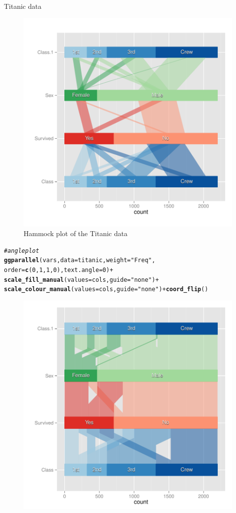 \documentclass[11pt]{book}\usepackage[]{graphicx}\usepackage[]{color}
\makeatletter
\newcommand{\hlnum}[1]{\textcolor[rgb]{0.686,0.059,0.569}{#1}}%
\newcommand{\hlstr}[1]{\textcolor[rgb]{0.192,0.494,0.8}{#1}}%
\newcommand{\hlcom}[1]{\textcolor[rgb]{0.678,0.584,0.686}{\textit{#1}}}%
\newcommand{\hlopt}[1]{\textcolor[rgb]{0,0,0}{#1}}%
\newcommand{\hlstd}[1]{\textcolor[rgb]{0.345,0.345,0.345}{#1}}%
\newcommand{\hlkwc}[1]{\textcolor[rgb]{0.333,0.667,0.333}{#1}}%
\newcommand{\hlkwd}[1]{\textcolor[rgb]{0.737,0.353,0.396}{\textbf{#1}}}%
\newenvironment{kframe}{%
 \def\at@end@of@kframe{}%
 \ifinner\ifhmode%
  \def\at@end@of@kframe{\end{minipage}}%
  \begin{minipage}{\columnwidth}%
 \fi\fi%
 \def\FrameCommand##1{\hskip\@totalleftmargin \hskip-\fboxsep
 \colorbox{shadecolor}{##1}\hskip-\fboxsep
     \hskip-\linewidth \hskip-\@totalleftmargin \hskip\columnwidth}%
 \MakeFramed {\advance\hsize-\width
   \@totalleftmargin\z@ \linewidth\hsize
   \@setminipage}}%
 {\par\unskip\endMakeFramed%
 \at@end@of@kframe}
\newenvironment{knitrout}{}{} %
\renewenvironment{knitrout}{\small\renewcommand{\baselinestretch}{.85}}{} %
\makeatother
\begin{document}
\begin{Example}{Titanic data}
\begin{knitrout}
\begin{figure}[htbp]
\centerline{\includegraphics[width=.6\textwidth]{ch05/fig/titanic-par2} }

\caption[Hammock plot of the Titanic data]{Hammock plot of the Titanic data\label{fig:titanic-par2}}
\end{figure}


\end{knitrout}


\begin{knitrout}
\color{fgcolor}\begin{kframe}
\begin{alltt}
\hlcom{# angle plot}
\hlkwd{ggparallel}\hlstd{(vars,} \hlkwc{data}\hlstd{=titanic,} \hlkwc{weight}\hlstd{=}\hlstr{"Freq"}\hlstd{,}
           \hlkwc{order}\hlstd{=}\hlkwd{c}\hlstd{(}\hlnum{0}\hlstd{,}\hlnum{1}\hlstd{,}\hlnum{1}\hlstd{,}\hlnum{0}\hlstd{),} \hlkwc{text.angle}\hlstd{=}\hlnum{0}\hlstd{)} \hlopt{+}
  \hlkwd{scale_fill_manual}\hlstd{(}\hlkwc{values}\hlstd{=cols,} \hlkwc{guide}\hlstd{=}\hlstr{"none"}\hlstd{)} \hlopt{+}
  \hlkwd{scale_colour_manual}\hlstd{(}\hlkwc{values}\hlstd{=cols,} \hlkwc{guide}\hlstd{=}\hlstr{"none"}\hlstd{)} \hlopt{+} \hlkwd{coord_flip}\hlstd{()}
\end{alltt}
\end{kframe}\begin{figure}[htbp]


\centerline{\includegraphics[width=.6\textwidth]{ch05/fig/titanic-par3} }


\end{figure}
\end{knitrout}
\end{Example}
\end{document}
